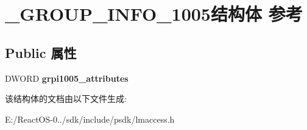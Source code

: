 \hypertarget{struct___g_r_o_u_p___i_n_f_o__1005}{}\section{\+\_\+\+G\+R\+O\+U\+P\+\_\+\+I\+N\+F\+O\+\_\+1005结构体 参考}
\label{struct___g_r_o_u_p___i_n_f_o__1005}
\subsection*{Public 属性}
\begin{DoxyCompactItemize}
\item 
\mbox{\label{struct___g_r_o_u_p___i_n_f_o__1005_a8738c68fdf7992c4b927352b646cfa55}} 
D\+W\+O\+RD {\bfseries grpi1005\+\_\+attributes}
\end{DoxyCompactItemize}


该结构体的文档由以下文件生成\+:\begin{DoxyCompactItemize}
\item 
E\+:/\+React\+O\+S-\/0../sdk/include/psdk/lmaccess.\+h\end{DoxyCompactItemize}
